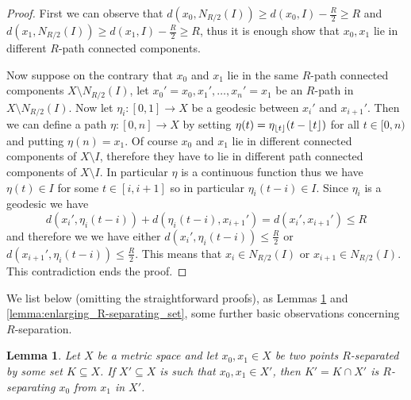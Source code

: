 \documentclass[12pt, a4paper]{article}
\newcommand{\8}{\infty}
\DeclarePairedDelimiter\floor{\lfloor}{\rfloor}
\theoremstyle{break}
\newtheorem{lm}[thm]{Lemma}
\theoremstyle{defbreak}
\begin{document}
\begin{proof}
    First we can observe that $d(x_0,N_{R/2}(I)) \geqslant d(x_0,I) - \frac{R}{2} \geqslant R$ and $d(x_1,N_{R/2}(I)) \geqslant d(x_1,I) - \frac{R}{2} \geqslant R$, thus it is enough show that $x_0, x_1$ lie in different $R$-path connected components.

    Now suppose on the contrary that $x_0$ and $x_1$ lie in the same $R$-path connected components $X\setminus N_{R/2}(I)$, let $x_0' = x_0, x_1', \ldots, x_n'=x_1$ be an $R$-path in $X\setminus N_{R/2}(I)$. Now let $\eta_{i}:[0,1]\to X$ be a geodesic between $x_i'$ and $x_{i+1}'$. Then we can define a path $\eta: [0,n]\to X$ by setting $\eta(t) = \eta_{\floor{t}}(t-\floor{t})$ for all $t \in [0,n)$ and putting $\eta(n) = x_1$. Of course $x_0$ and $x_1$ lie in different connected components of $X\setminus I$, therefore they have to lie in different path connected components of $X\setminus I$. In particular $\eta$ is a continuous function thus we have $\eta(t)\in I$ for some $t\in [i,i+1]$ so in particular $\eta_{i}(t-i) \in I$. Since $\eta_{i}$ is a geodesic we have $$d(x_{i}',\eta_{i}(t-i)) + d(\eta_{i}(t-i),x_{i+1}') = d(x_{i}',x_{i+1}') \leqslant R$$
    and therefore we we have either $d(x_{i}',\eta_{i}(t-i))\leqslant \frac{R}{2}$ or $d(x_{i+1}',\eta_{i}(t-i))\leqslant \frac{R}{2}$. This means that $x_{i}\in N_{R/2}(I)$ or $x_{i+1}\in N_{R/2}(I)$. This contradiction ends the proof.
\end{proof}

We list below (omitting the straightforward proofs), as Lemmas 
\ref{restricting-separating-sets} and \ref{lemma:enlarging_R-separating_set},
some further basic observations concerning $R$-separation.


\medskip
\begin{lm}\label{restricting-separating-sets}
    Let $X$ be a metric space and let $x_0,x_1\in X$ be two points $R$-separated by some set $K \subseteq X$. If $X' \subseteq X$ is such that $x_0,x_1\in X'$, then $K' = K\cap X'$ is $R$-separating $x_0$ from $x_1$ in $X'$. 
\end{lm}

\end{document}
